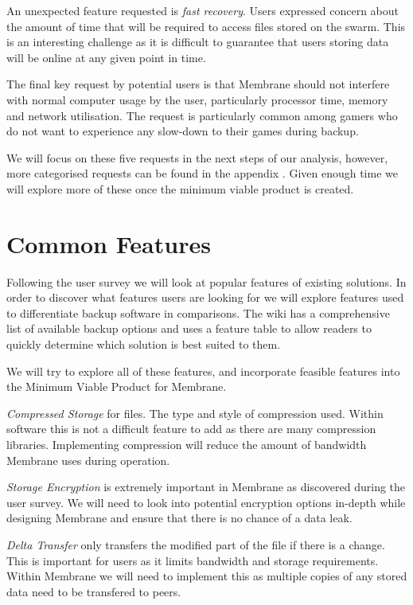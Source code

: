 \documentclass[a4paper, 11pt, twocolumn, twoside]{report}
\begin{document}
An unexpected feature requested is \emph{fast recovery}. Users expressed concern about the amount of time that will be required to access files stored on the swarm. This is an interesting challenge as it is difficult to guarantee that users storing data will be online at any given point in time.

The final key request by potential users is that Membrane should not interfere with normal computer usage by the user, particularly processor time, memory and network utilisation. The request is particularly common among gamers who do not want to experience any slow-down to their games during backup.

We will focus on these five requests in the next steps of our analysis, however, more categorised requests can be found in the appendix . Given enough time we will explore more of these once the minimum viable product is created.

\section{Common Features}

Following the user survey we will look at popular features of existing solutions. In order to discover what features users are looking for we will explore features used to differentiate backup software in comparisons. The \cite{arch2017syncandbackup} wiki has a comprehensive list of available backup options and uses a feature table to allow readers to quickly determine which solution is best suited to them.

We will try to explore all of these features, and incorporate feasible features into the Minimum Viable Product for Membrane.

\emph{Compressed Storage} for files. The type and style of compression used. Within software this is not a difficult feature to add as there are many compression libraries. Implementing compression will reduce the amount of bandwidth Membrane uses during operation.

\emph{Storage Encryption} is extremely important in Membrane as discovered during the user survey. We will need to look into potential encryption options in-depth while designing Membrane and ensure that there is no chance of a data leak.

\emph{Delta Transfer} only transfers the modified part of the file if there is a change. This is important for users as it limits bandwidth and storage requirements. Within Membrane we will need to implement this as multiple copies of any stored data need to be transfered to peers.
\end{document}
